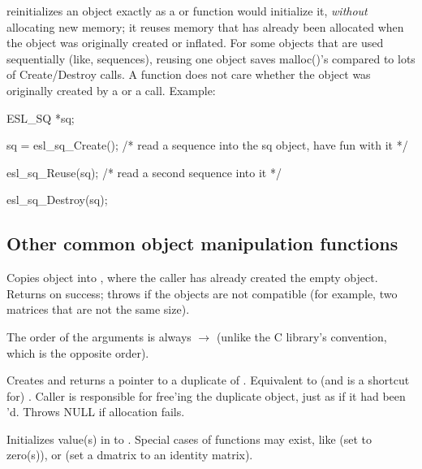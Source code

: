 \begin{sreitems}{}
\item [\ccode{Reuse}] 
    reinitializes an object exactly as a
    or  function would initialize it, \emph{without}
   allocating new memory; it reuses memory that has
   already been allocated when the object was originally created or
   inflated. For some objects that are used sequentially (like,
   sequences), reusing one object saves malloc()'s compared to
   lots of Create/Destroy calls. A  function does not
   care whether the object was originally created by a 
   or a  call. Example:

\begin{cchunk}
ESL_SQ *sq;

sq = esl_sq_Create();
  /* read a sequence into the sq object, have fun with it */

esl_sq_Reuse(sq);
  /* read a second sequence into it */

esl_sq_Destroy(sq);
\end{cchunk}

\end{sreitems}

\subsection{Other common object manipulation functions}

\begin{sreitems}{}

\item[\ccode{\_Copy(src, dest)}]
Copies  object into , where the caller has
already created the empty  object. Returns 
on success; throws  if the objects are not
compatible (for example, two matrices that are not the same size).

The order of the arguments is always  $\rightarrow$
 (unlike the C library's  convention, which
is the opposite order).

\item[\ccode{\_Duplicate(obj)}] 

Creates and returns a pointer to a duplicate of .
Equivalent to (and is a shortcut for) . Caller is responsible for free'ing the duplicate
object, just as if it had been 'd. Throws NULL if
allocation fails.

\item[\ccode{\_Set*(obj, value...)}]

Initializes value(s) in  to . Special cases of
 functions may exist, like  (set to
zero(s)), or  (set a dmatrix to an
identity matrix).

\end{sreitems}


